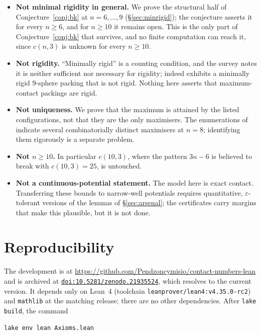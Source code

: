 \documentclass[11pt,a4paper]{article}
\theoremstyle{plain}
\theoremstyle{definition}
\begin{document}
\begin{itemize}[leftmargin=*]
\item \textbf{Not minimal rigidity in general.} We prove the structural half of
  Conjecture~\ref{conj:bk} at $n = 6,\dots,9$ (\S\ref{sec:minrigid}); the conjecture
  asserts it for every $n \ge 6$, and for $n \ge 10$ it remains open. This is the only
  part of Conjecture~\ref{conj:bk} that survives, and no finite computation can reach
  it, since $c(n,3)$ is unknown for every $n \ge 10$.
\item \textbf{Not rigidity.} ``Minimally rigid'' is a counting condition, and the
  survey notes it is neither sufficient nor necessary for rigidity; indeed
  \cite[Fig.~1]{BezdekKhan2018} exhibits a minimally rigid $9$-sphere packing that is
  not rigid. Nothing here asserts that maximum-contact packings are rigid.
\item \textbf{Not uniqueness.} We prove that the maximum is attained by the listed
  configurations, not that they are the only maximisers. The enumerations
  of~\cite{ArkusSIAM2011,HolmesCerfon2016} indicate several combinatorially distinct
  maximisers at $n = 8$; identifying them rigorously is a separate problem.
\item \textbf{Not $n \ge 10$.} In particular $c(10,3)$, where the pattern $3n-6$ is
  believed to break with $c(10,3) = 25$, is untouched.
\item \textbf{Not a continuous-potential statement.} The model here is exact contact.
  Transferring these bounds to narrow-well potentials requires quantitative,
  $\varepsilon$-tolerant versions of the lemmas of \S\ref{sec:arsenal}; the
  certificates carry margins that make this plausible, but it is not done.
\end{itemize}

\section{Reproducibility}
\label{sec:repro}

The development is at
\url{https://github.com/Pendzoncymisio/contact-numbers-lean} and is archived at
\href{https://doi.org/10.5281/zenodo.21935524}{\texttt{doi:10.5281/zenodo.21935524}},
which resolves to the current version. It depends only on Lean~4
(toolchain \texttt{leanprover/lean4:v4.35.0-rc2}) and \texttt{mathlib} at the matching
release; there are no other dependencies. After \texttt{lake build}, the command

\begin{Verbatim}
lake env lean Axioms.lean
\end{Verbatim}
\end{document}
